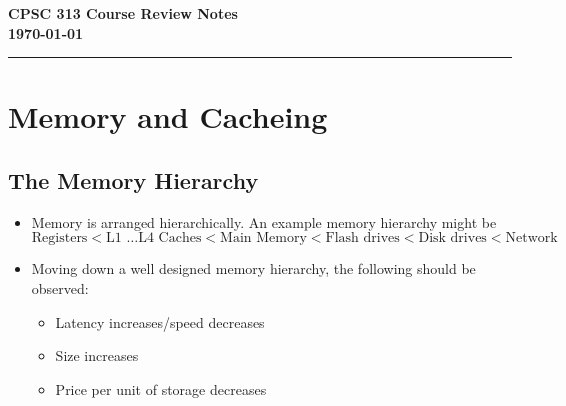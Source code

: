 \documentclass[12pt]{article}
\newcommand{\course}{CPSC 313}
\newcommand{\assign}{Course Review Notes}
\begin{document}
\fancyhf{} 

\rhead{\course}

\begin{center} 
	{\bf{\course \hspace{5pt} \assign}} \\ 
	\smallskip
	{\bf{\today}}
\end{center}  
\hrule
\bigskip

\section{Memory and Cacheing}
\subsection{The Memory Hierarchy}
\begin{itemize}
	\item Memory is arranged hierarchically. An example memory hierarchy might be
		\begin{equation*}
			\textrm{Registers} < \textrm{L1 \ldots L4 Caches} < \textrm{Main Memory} < \textrm{Flash drives} < \textrm{Disk drives} < \textrm{Network}
		\end{equation*}
	\item Moving down a well designed memory hierarchy, the following should be observed:
		\begin{itemize}
			\item Latency increases/speed decreases
			\item Size increases
			\item Price per unit of storage decreases
		\end{itemize}
\end{itemize}
\end{document}
